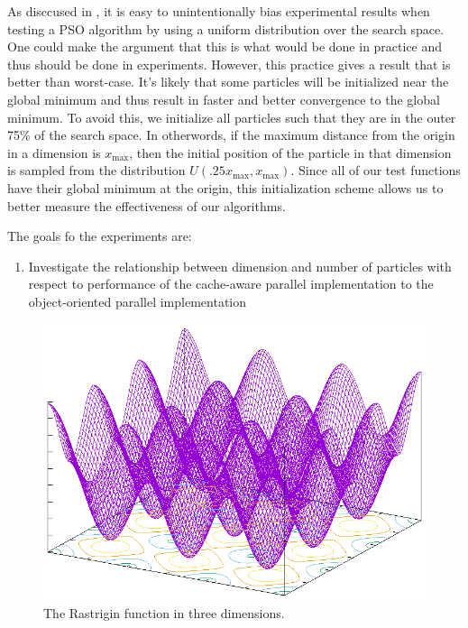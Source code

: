 As disccused in \cite{spso}, it is easy to unintentionally bias experimental
results when testing a PSO algorithm by using a uniform distribution over the
search space. One could make the argument that this is what would be done in
practice and thus should be done in experiments. However, this practice gives a
result that is better than worst-case. It's likely that some particles will be
initialized near the global minimum and thus result in faster and better
convergence to the global minimum. To avoid this, we initialize all particles
such that they are in the outer 75\% of the search space. In otherwords, if the
maximum distance from the origin in a dimension is $x_{\max}$, then the
initial position of the particle in that dimension is sampled from the
distribution $U(.25 x_{\max}, x_{\max})$. Since all of our test functions have
their global minimum at the origin, this initialization scheme allows us to
better measure the effectiveness of our algorithms.

The goals fo the experiments are:
\begin{enumerate}
  \item Investigate the relationship between dimension and number of particles
    with respect to performance of the cache-aware parallel implementation to
    the object-oriented parallel implementation
\end{enumerate}

\begin{figure}
  \includegraphics[width=\columnwidth]{../img/output/rastrigin}
  \caption{The Rastrigin function in three dimensions.}\label{fig:rastrigin}
\end{figure}

